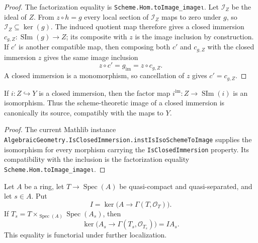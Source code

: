 \begin{proof}
  \leanok
  The factorization equality is \texttt{Scheme.Hom.toImage_imageι}.
  Let $\mathcal I_Z$ be the ideal of $Z$.  From
  $z\circ h=g$ every local section of $\mathcal I_Z$ maps to zero under $g$,
  so $\mathcal I_Z\subseteq\operatorname{ker}(g)$.  The induced quotient map
  therefore gives a closed immersion
  $c_{g,Z}\colon\operatorname{SIm}(g)\to Z$; its composite with $z$ is the
  image inclusion by construction.  If $c'$ is another compatible map, then
  composing both $c'$ and $c_{g,Z}$ with the closed immersion $z$ gives the
  same image inclusion
  \[
    z\circ c'=g_{\mathrm{im}}=z\circ c_{g,Z}.
  \]
  A closed immersion is a monomorphism, so cancellation of $z$ gives
  $c'=c_{g,Z}$.
  \end{proof}

\begin{lemma}
  \label{lemma:nagata-scheme-image-of-closed-immersion}
  \leanok

  If $i\colon Z\hookrightarrow Y$ is a closed immersion, then the factor map
  $i^{\mathrm{im}}\colon Z\to\operatorname{SIm}(i)$ is an isomorphism.  Thus
  the scheme-theoretic image of a closed immersion is canonically its source,
  compatibly with the maps to $Y$.
\end{lemma}

\begin{proof}
  \leanok
  The current Mathlib instance
  \texttt{AlgebraicGeometry.IsClosedImmersion.instIsIsoSchemeToImage}
  supplies the isomorphism for every morphism carrying the
  \texttt{IsClosedImmersion} property.  Its compatibility with the inclusion
  is the factorization equality
  \texttt{Scheme.Hom.toImage\_imageι}.
\end{proof}

\begin{lemma}
  \label{lemma:nagata-affine-image-kernel-localization}
  \leanok

  Let $A$ be a ring, let $T\to\operatorname{Spec}(A)$ be quasi-compact and
  quasi-separated, and let $s\in A$.  Put
  \[
    I=\ker\bigl(A\longrightarrow\Gamma(T,\mathcal O_T)\bigr).
  \]
  If $T_s=T\times_{\operatorname{Spec}(A)}\operatorname{Spec}(A_s)$, then
  \[
    \ker\bigl(A_s\longrightarrow\Gamma(T_s,\mathcal O_{T_s})\bigr)=IA_s.
  \]
  This equality is functorial under further localization.
\end{lemma}

